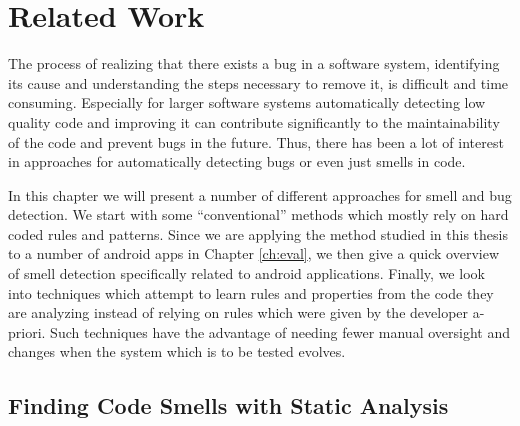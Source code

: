 \chapter{Related Work}\label{ch:relWork}



The process of realizing that there exists a bug in a software system, identifying its cause and understanding the steps necessary to remove it, is difficult and time consuming.
Especially for larger software systems automatically detecting low quality code and improving it can contribute significantly to the maintainability of the code and prevent bugs in the future.
Thus, there has been a lot of interest in approaches for automatically detecting bugs or even just smells in code.

In this chapter we will present a number of different approaches for smell and bug detection.
We start with some ``conventional'' methods which mostly rely on hard coded rules and patterns.
Since we are applying the method studied in this thesis to a number of android apps in Chapter \ref{ch:eval}, we then give a quick overview of smell detection specifically related to android applications.
Finally, we look into techniques which attempt to learn rules and properties from the code they are analyzing instead of relying on rules which were given by the developer a-priori.
Such techniques have the advantage of needing fewer manual oversight and changes when the system which is to be tested evolves.

\section{Finding Code Smells with Static Analysis}

